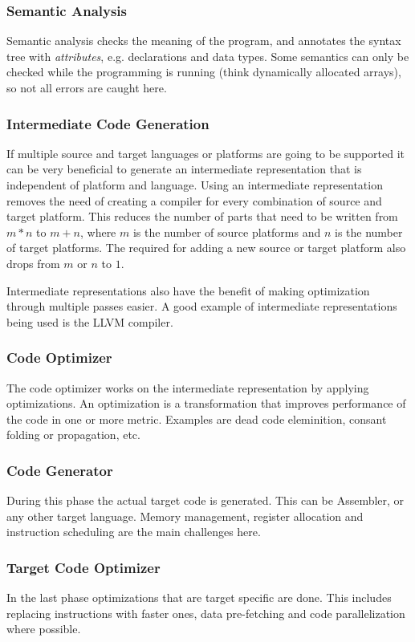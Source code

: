 \documentclass{article}
\begin{document}
\subsubsection{Semantic Analysis}
Semantic analysis checks the meaning of the program, and annotates the syntax tree with \emph{attributes}, e.g. declarations and data types.
Some semantics can only be checked while the programming is running (think dynamically allocated arrays), so not all errors are caught here.

\subsubsection{Intermediate Code Generation}
If multiple source and target languages or platforms are going to be supported it can be very beneficial to generate an intermediate representation that is independent of platform and language.
Using an intermediate representation removes the need of creating a compiler for every combination of source and target platform.
This reduces the number of parts that need to be written from $m*n$ to $m+n$, where $m$ is the number of source platforms and $n$ is the number of target platforms.
The required for adding a new source or target platform also drops from $m$ or $n$ to $1$.

Intermediate representations also have the benefit of making optimization through multiple passes easier.
A good example of intermediate representations being used is the LLVM compiler.

\subsubsection{Code Optimizer}
The code optimizer works on the intermediate representation by applying optimizations.
An optimization is a transformation that improves performance of the code in one or more metric.
Examples are dead code eleminition, consant folding or propagation, etc.

\subsubsection{Code Generator}
During this phase the actual target code is generated.
This can be Assembler, or any other target language.
Memory management, register allocation and instruction scheduling are the main challenges here.

\subsubsection{Target Code Optimizer}
In the last phase optimizations that are target specific are done.
This includes replacing instructions with faster ones, data pre-fetching and code parallelization where possible.
\end{document}
